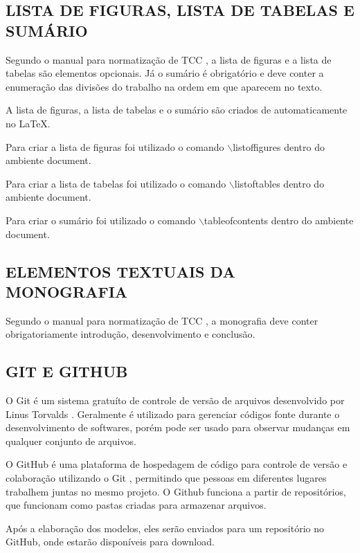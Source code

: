 \subsection{LISTA DE FIGURAS, LISTA DE TABELAS E SUMÁRIO}
Segundo o manual para normatização de TCC \cite{manualTCC}, a lista de figuras e a lista de tabelas são elementos opcionais. Já o sumário é obrigatório e deve conter a enumeração das divisões do trabalho na ordem em que aparecem no texto.

A lista de figuras, a lista de tabelas e o sumário são criados de automaticamente no LaTeX.

Para criar a lista de figuras foi utilizado o comando $\backslash$listoffigures dentro do ambiente document.

Para criar a lista de tabelas foi utilizado o comando $\backslash$listoftables dentro do ambiente document.

Para criar o sumário foi utilizado o comando $\backslash$tableofcontents dentro do ambiente document.

\subsection{ELEMENTOS TEXTUAIS DA MONOGRAFIA}
Segundo o manual para normatização de TCC \cite{manualTCC}, a monografia deve conter obrigatoriamente introdução, desenvolvimento e conclusão.

\subsection{GIT E GITHUB}
\indent O Git é um sistema gratuíto de controle de versão de arquivos desenvolvido por Linus Torvalds \cite{GIT2018}. Geralmente é utilizado para gerenciar códigos fonte durante o desenvolvimento de softwares, porém pode ser usado para observar mudanças em qualquer conjunto de arquivos.

O GitHub é uma plataforma de hospedagem de código para controle de versão e colaboração utilizando o Git \cite{GITHUB2018}, permitindo que pessoas em diferentes lugares trabalhem juntas no mesmo projeto. O Github funciona a partir de repositórios, que funcionam como pastas criadas para armazenar arquivos.

Após a elaboração dos modelos, eles serão enviados para um repositório no GitHub, onde estarão disponíveis para download. 
